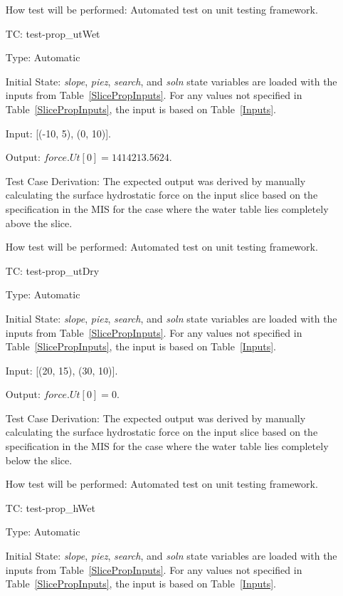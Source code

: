 \documentclass[12pt, titlepage]{article}
\newcounter{utestnum} %
\begin{document}
\begin{enumerate}[label=TC\arabic*:,ref={\arabic*}]
	How test will be performed: Automated test on unit testing framework.
	
	\item [TC\refstepcounter{utestnum}\theutestnum: 
	\label{TC_PropertyUtWet}] 
	test-prop\_utWet
	
	Type: Automatic
	
	Initial State: \textit{slope}, \textit{piez}, \textit{search}, and 
	\textit{soln} state variables are loaded with the inputs from 
	Table~\ref{SlicePropInputs}. For any values not specified in 
	Table~\ref{SlicePropInputs}, the input is based on Table~\ref{Inputs}.
	
	Input: [(-10, 5), (0, 10)].
	
	Output: $\textit{force.Ut}[0] = 1414213.5624$.
	
	Test Case Derivation: The expected output was derived by manually 
	calculating the surface hydrostatic force on the input slice based on the 
	specification in the MIS for the case where the water table lies completely 
	above the slice.
	
	How test will be performed: Automated test on unit testing framework.
	
	\item [TC\refstepcounter{utestnum}\theutestnum: 
	\label{TC_PropertyUtDry}] 
	test-prop\_utDry
	
	Type: Automatic
	
	Initial State: \textit{slope}, \textit{piez}, \textit{search}, and 
	\textit{soln} state variables are loaded with the inputs from 
	Table~\ref{SlicePropInputs}. For any values not specified in 
	Table~\ref{SlicePropInputs}, the input is based on Table~\ref{Inputs}.
	
	Input: [(20, 15), (30, 10)].
	
	Output: $\textit{force.Ut}[0] = 0$.
	
	Test Case Derivation: The expected output was derived by manually 
	calculating the surface hydrostatic force on the input slice based on the 
	specification in the MIS for the case where the water table lies completely 
	below the slice.
	
	How test will be performed: Automated test on unit testing framework.
	
	\item [TC\refstepcounter{utestnum}\theutestnum: 
	\label{TC_PropertyHWet}] 
	test-prop\_hWet
	
	Type: Automatic
	
	Initial State: \textit{slope}, \textit{piez}, \textit{search}, and 
	\textit{soln} state variables are loaded with the inputs from 
	Table~\ref{SlicePropInputs}. For any values not specified in 
	Table~\ref{SlicePropInputs}, the input is based on Table~\ref{Inputs}.
	

\end{enumerate}
\end{document}

